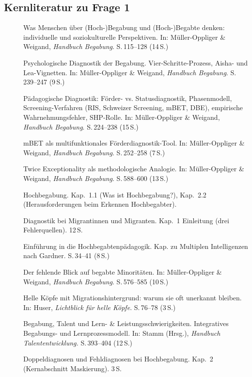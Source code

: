 \documentclass[ngerman, a4paper]{article}
\begin{document}
\subsection{Kernliteratur zu Frage 1}
 
\begin{description}
  \item[\cite{baudson2021wasdenken}] Was Menschen über (Hoch-)Begabung und
    (Hoch-)Begabte denken: individuelle und soziokulturelle Perspektiven.
    In: Müller-Oppliger \& Weigand, \textit{Handbuch Begabung}.
    S.\,115--128 (14\,S.)
  \item[\cite{gauckreimann2021psychdiagnostik}] Psychologische Diagnostik der
    Begabung. Vier-Schritte-Prozess, Aisha- und Lea-Vignetten.
    In: Müller-Oppliger \& Weigand, \textit{Handbuch Begabung}.
    S.\,239--247 (9\,S.)
  \item[\cite{muelleroppliger2021paeddiagnostik}] Pädagogische Diagnostik:
    Förder- vs. Statusdiagnostik, Phasenmodell, Screening-Verfahren (RIS,
    Schweizer Screening, mBET, DBE), empirische Wahrnehmungsfehler,
    SHP-Rolle.
    In: Müller-Oppliger \& Weigand, \textit{Handbuch Begabung}.
    S.\,224--238 (15\,S.)
  \item[\cite{stahl2021mbet}] mBET als multifunktionales Förderdiagnostik-Tool.
    In: Müller-Oppliger \& Weigand, \textit{Handbuch Begabung}.
    S.\,252--258 (7\,S.)
  \item[\cite{baumschader2021twice}] Twice Exceptionality als methodologische Analogie.
    In: Müller-Oppliger \& Weigand, \textit{Handbuch Begabung}.
    S.\,588--600 (13\,S.)
  \item[\cite{preckel2013hochbegabung}] Hochbegabung.
    Kap.~1.1 (Was ist Hochbegabung?), Kap.~2.2 (Herausforderungen beim Erkennen Hochbegabter).
  \item[\cite{maehler2018diagnostik}] Diagnostik bei Migrantinnen und Migranten.
    Kap.~1 Einleitung (drei Fehlerquellen). 12\,S.
  \item[\cite{trautmann2016einfuehrung}] Einführung in die
    Hochbegabtenpädagogik. Kap. zu Multiplen Intelligenzen nach Gardner.
    S.\,34--41 (8\,S.)
  \item[\cite{stamm2021fehlenderblick}] Der fehlende Blick auf begabte Minoritäten.
    In: Müller-Oppliger \& Weigand, \textit{Handbuch Begabung}. S.\,576--585 (10\,S.)
  \item[\cite{kellerkoller2021hellekoepfe}] Helle Köpfe mit Migrationshintergrund:
    warum sie oft unerkannt bleiben. In: Huser, \textit{Lichtblick für helle Köpfe}.
    S.\,76--78 (3\,S.)
  \item[\cite{fischerfischerontrup2014integratives}] Begabung, Talent und
      Lern- \& Leistungsschwierigkeiten. Integratives Begabungs- und
      Lernprozessmodell.
      In: Stamm (Hrsg.), \textit{Handbuch Talententwicklung.}
      S.\,393--404 (12\,S.)
  \item[\cite{webb2020doppeldiagnosen}] Doppeldiagnosen und Fehldiagnosen bei
    Hochbegabung. Kap.~2 (Kernabschnitt Maskierung). 3\,S.
\end{description}
 
\end{document}
